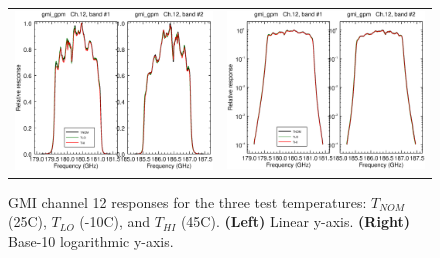 \begin{figure}[htp]
  \centering
  \begin{tabular}{c c}
    \includegraphics[scale=0.3]{graphics/lin/gmi_gpm-12.eps} &
    \includegraphics[scale=0.3]{graphics/log/gmi_gpm-12.eps}
  \end{tabular}
  \caption{GMI channel 12 responses for the three test temperatures: $T_{NOM}$ (25\textdegree{}C), $T_{LO}$ (-10\textdegree{}C), and $T_{HI}$ (45\textdegree{}C). \textbf{(Left)} Linear y-axis. \textbf{(Right)} Base-10 logarithmic y-axis.}
  \label{fig:ch12_response}
\end{figure}

